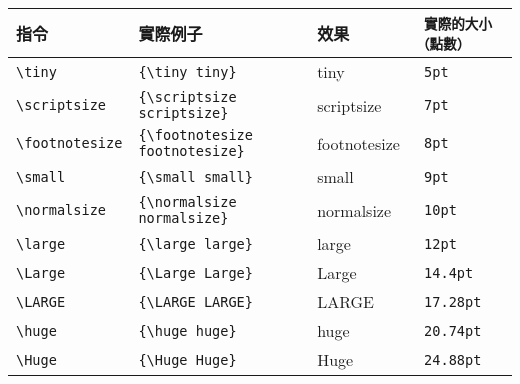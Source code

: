\documentclass[crop=true]{standalone}
\begin{document}
\begin{tabular}{lll>{\tt}l}
  指令 & 實際例子 & 效果 & 實際的大小（點數）\\
  \hline
  \verb|\tiny| & \verb|{\tiny tiny}| & {\tiny tiny} & 5pt \\
  \verb|\scriptsize| & \verb|{\scriptsize scriptsize}| & {\scriptsize scriptsize} & 7pt \\
  \verb|\footnotesize| & \verb|{\footnotesize footnotesize}| & {\footnotesize footnotesize} & 8pt \\
  \verb|\small| & \verb|{\small small}| & {\small small} & 9pt \\
  \verb|\normalsize| & \verb|{\normalsize normalsize}| & {\normalsize normalsize} & 10pt \\
  \verb|\large| & \verb|{\large large}| & {\large large} & 12pt \\
  \verb|\Large| & \verb|{\Large Large}| & {\Large Large} & 14.4pt \\[.7ex]
  \verb|\LARGE| & \verb|{\LARGE LARGE}| & {\LARGE LARGE} & 17.28pt \\
  \verb|\huge| &  \verb|{\huge huge}| & {\huge huge} & 20.74pt \\
  \verb|\Huge| &  \verb|{\Huge Huge}| & {\Huge Huge} & 24.88pt \\
\end{tabular}
\end{document}
